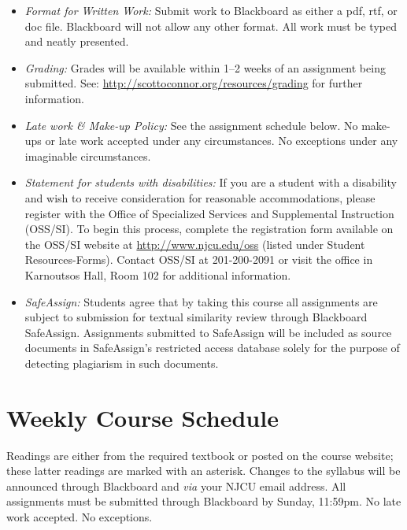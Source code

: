\documentclass[article,oneside]{memoir}
\begin{document}
\begin{itemize}
\item \textit{Format for Written Work:} Submit work to Blackboard as either a pdf, rtf, or doc file. Blackboard will not allow any other format. All work must be typed and neatly presented. 


\item \textit{Grading:} Grades will be available within 1--2 weeks of an assignment being submitted. See: \href{http://scottoconnor.org/resources/grading}{http://scottoconnor.org/resources/grading} for further information.


\item \textit{Late work \& Make-up Policy:} See the assignment schedule below. No make-ups or late work accepted under any circumstances. No exceptions under any imaginable circumstances.

\item \textit{Statement for students with disabilities:} If you are a student with a disability and wish to receive consideration for reasonable accommodations, please register with the Office of Specialized Services and Supplemental Instruction (OSS/SI). To begin this process, complete the registration form available on the OSS/SI website at \href{http://www.njcu.edu/oss}{http://www.njcu.edu/oss} (listed under Student Resources-Forms). Contact OSS/SI at 201-200-2091 or visit the office in Karnoutsos Hall, Room 102 for additional information.
 

\item \textit{SafeAssign:} Students agree that by taking this course all assignments are subject to submission for textual similarity review through Blackboard SafeAssign. Assignments submitted to SafeAssign will be included as source documents in SafeAssign's restricted access database solely for the purpose of detecting plagiarism in such documents.  


\end{itemize}





\section{Weekly Course Schedule}
Readings are either from the required textbook or posted on the course website; these latter readings are marked with an asterisk. Changes to the syllabus will be announced through Blackboard and \emph{via} your NJCU email address.  All assignments must be submitted through Blackboard by Sunday, 11:59pm. No late work accepted. No exceptions.  
\end{document}
